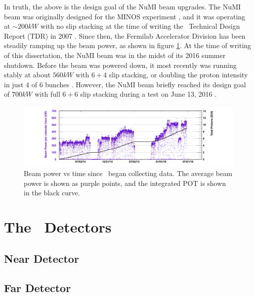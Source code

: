 In truth, the above is the design goal of the NuMI beam upgrades. The NuMI beam was originally designed for the MINOS experiment \cite{ref:TDRNuMI}, and it was operating at ${\sim}200\unit{kW}$ with no slip stacking at the time of writing the \nova~Technical Design Report (TDR) in 2007 \cite{ref:TDRNOvA}. Since then, the Fermilab Accelerator Division has been steadily ramping up the beam power, as shown in figure \ref{fig:BeamPower}. At the time of writing of this dissertation, the NuMI beam was in the midst of its 2016 summer shutdown. Before the beam was powered down, it most recently was running stably at about $560\unit{kW}$ with $6{+}4$ slip stacking, or doubling the proton intensity in just $4$ of $6$ bunches \cite{ref:IntensitykW, ref:IntensitySlip}. However, the NuMI beam briefly reached its design goal of $700\unit{kW}$ with full $6{+}6$ slip stacking during a test on June 13, 2016 \cite{ref:Intensity700}.
\begin{figure}[htb]
  \centering
  \includegraphics[width=1\textwidth]{figures/BeamPower.png}
  \caption[Beam Power vs Time]{Beam power vs time since \nova~began collecting data. The average beam power is shown as purple points, and the integrated POT is shown in the black curve.}
  \label{fig:BeamPower}
\end{figure}

\section{The \nova~Detectors}

\subsection{Near Detector}

\subsection{Far Detector}